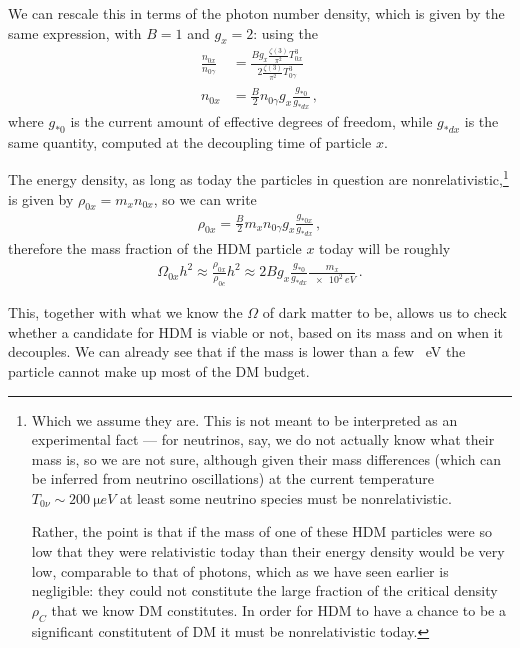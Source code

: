 \documentclass[main.tex]{subfiles}
\begin{document}
We can rescale this in terms of the photon number density, which is given by the same expression, with \(B = 1\) and \(g_x = 2\): using the 
%
\begin{align}
\frac{n_{0x}}{n_{0\gamma }} &= \frac{B g_x \frac{\zeta (3)}{\pi^2} T^3_{0x}}{2 \frac{\zeta (3)}{\pi^2} T^3_{0 \gamma }} \\
n_{0x} &= \frac{B}{2} n_{0 \gamma } g_x \frac{g_{*0}}{g_{*dx}}
\,,
\end{align}
%
where \(g_{*0}\) is the current amount of effective degrees of freedom, while \(g_{*dx}\) is the same quantity, computed at the decoupling time of particle \(x\). 


The energy density, as long as today the particles in question are nonrelativistic,\footnote{Which we assume they are. This is not meant to be interpreted as an experimental fact --- for neutrinos, say, we do not actually know what their mass is, so we are not sure, although given their mass differences (which can be inferred from neutrino oscillations) at the current temperature \(T_{0 \nu } \sim \SI{200}{\micro eV}\) at least some neutrino species must be nonrelativistic. 

Rather, the point is that if the mass of one of these HDM particles were so low that they were relativistic today than their energy density would be very low, comparable to that of photons, which as we have seen earlier is negligible: they could not constitute the large fraction of the critical density \(\rho _C\) that we know DM constitutes.
In order for HDM to have a chance to be a significant constitutent of DM it must be nonrelativistic today.} is given by \(\rho_{0x} = m_x n_{0x}\), so we can write 
%
\begin{align}
  \rho_{0x} = \frac{B}{2} m_x n_{0 \gamma } g_x \frac{g_{*0x}}{g_{*dx}}
\,,
\end{align}
%
therefore the mass fraction of the HDM particle \(x\) today will be roughly
%
\begin{align}
\Omega_{0x} h^2 \approx \frac{\rho_{0x}}{\rho_{0c}} h^2 
\approx 2B g_x \frac{g_{*0}}{g_{*dx}} \frac{m_x}{\SI{e2}{eV}}
\,.
\end{align}

This, together with what we know the \(\Omega\) of dark matter to be, allows us to check whether a candidate for HDM is viable or not, based on its mass and on when it decouples.
We can already see that if the mass is lower than a few \SI{}{eV} the particle cannot make up most of the DM budget.
\end{document}
